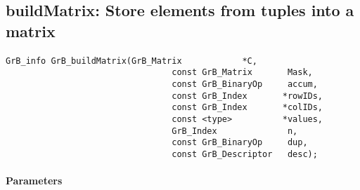 \subsection{{\sf buildMatrix}: Store elements from tuples into a matrix}
\label{Sec:buildMatrix}

\paragraph{\syntax}

\begin{Verbatim}[samepage=true]    
        GrB_info GrB_buildMatrix(GrB_Matrix            *C,
                                 const GrB_Matrix       Mask,
                                 const GrB_BinaryOp     accum,
                                 const GrB_Index       *rowIDs,
                                 const GrB_Index       *colIDs, 
                                 const <type>          *values,
                                 GrB_Index              n,
                                 const GrB_BinaryOp     dup,
                                 const GrB_Descriptor   desc);
\end{Verbatim}

\paragraph{Parameters}

